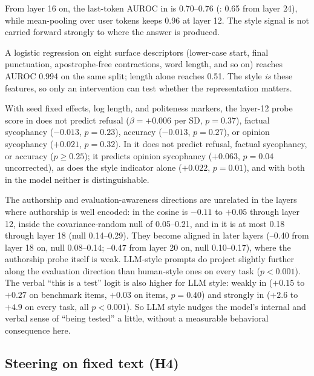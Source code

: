 From layer 16 on, the last-token AUROC in \llama is 0.70--0.76 (\qwen: 0.65 from layer 24), while mean-pooling over user tokens keeps 0.96 at \llama layer 12.
The style signal is not carried forward strongly to where the answer is produced.

A logistic regression on eight surface descriptors (lower-case start, final punctuation, apostrophe-free contractions, word length, and so on) reaches AUROC 0.994 on the same split; length alone reaches 0.51.
The style \emph{is} these features, so only an intervention can test whether the representation matters.

With seed fixed effects, log length, and politeness markers, the layer-12 probe score in \llama does not predict refusal ($\beta=+0.006$ per SD, $p=0.37$), factual sycophancy ($-0.013$, $p=0.23$), accuracy ($-0.013$, $p=0.27$), or opinion sycophancy ($+0.021$, $p=0.32$).
In \qwen it does not predict refusal, factual sycophancy, or accuracy ($p\geq0.25$); it predicts opinion sycophancy ($+0.063$, $p=0.04$ uncorrected), as does the style indicator alone ($+0.022$, $p=0.01$), and with both in the model neither is distinguishable.

The authorship and evaluation-awareness directions are unrelated in the layers where authorship is well encoded: in \llama the cosine is $-0.11$ to $+0.05$ through layer 12, inside the covariance-random null of 0.05--0.21, and in \qwen it is at most 0.18 through layer 18 (null 0.14--0.29).
They become aligned in later layers (--0.40 from layer 18 on, null 0.08--0.14; --0.47 from layer 20 on, null 0.10--0.17), where the authorship probe itself is weak.
LLM-style prompts do project slightly further along the evaluation direction than human-style ones on every task ($p<0.001$).
The verbal ``this is a test'' logit is also higher for LLM style: weakly in \llama ($+0.15$ to $+0.27$ on benchmark items, $+0.03$ on \wildchat items, $p=0.40$) and strongly in \qwen ($+2.6$ to $+4.9$ on every task, all $p<0.001$).
So LLM style nudges the model's internal and verbal sense of ``being tested'' a little, without a measurable behavioral consequence here.

\subsection{Steering on fixed text (H4)}
\label{sec:steer}

